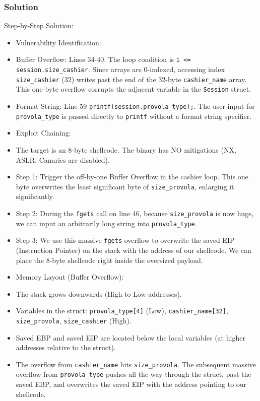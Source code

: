\documentclass{article}
\begin{document}
\subsubsection*{Solution}
Step-by-Step Solution:

\begin{itemize}
    \item[\textbf{1.}] Vulnerability Identification:
    \item Buffer Overflow: Lines 34-40. The loop condition is \texttt{i <= session.size\_cashier}. Since arrays are 0-indexed, accessing index \texttt{size\_cashier} (32) writes past the end of the 32-byte \texttt{cashier\_name} array. This one-byte overflow corrupts the adjacent variable in the \texttt{Session} struct.
    \item Format String: Line 59 \texttt{printf(session.provola\_type);}. The user input for \texttt{provola\_type} is passed directly to \texttt{printf} without a format string specifier.

    \item[\textbf{2.}] Exploit Chaining:
    \item The target is an 8-byte shellcode. The binary has NO mitigations (NX, ASLR, Canaries are disabled).
    \item Step 1: Trigger the off-by-one Buffer Overflow in the cashier loop. This one byte overwrites the least significant byte of \texttt{size\_provola}, enlarging it significantly.
    \item Step 2: During the \texttt{fgets} call on line 46, because \texttt{size\_provola} is now huge, we can input an arbitrarily long string into \texttt{provola\_type}.
    \item Step 3: We use this massive \texttt{fgets} overflow to overwrite the saved EIP (Instruction Pointer) on the stack with the address of our shellcode. We can place the 8-byte shellcode right inside the oversized payload.

    \item[\textbf{3.}] Memory Layout (Buffer Overflow):
    \item The stack grows downwards (High to Low addresses).
    \item Variables in the struct: \texttt{provola\_type[4]} (Low), \texttt{cashier\_name[32]}, \texttt{size\_provola}, \texttt{size\_cashier} (High).
    \item Saved EBP and saved EIP are located below the local variables (at higher addresses relative to the struct).
    \item The overflow from \texttt{cashier\_name} hits \texttt{size\_provola}. The subsequent massive overflow from \texttt{provola\_type} pushes all the way through the struct, past the saved EBP, and overwrites the saved EIP with the address pointing to our shellcode.
\end{itemize}
\end{document}
